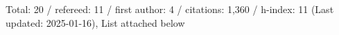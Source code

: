 Total: 20 / refereed: 11 / first author: 4 / citations: 1,360 / h-index: 11 (Last updated: 2025-01-16), List attached below
